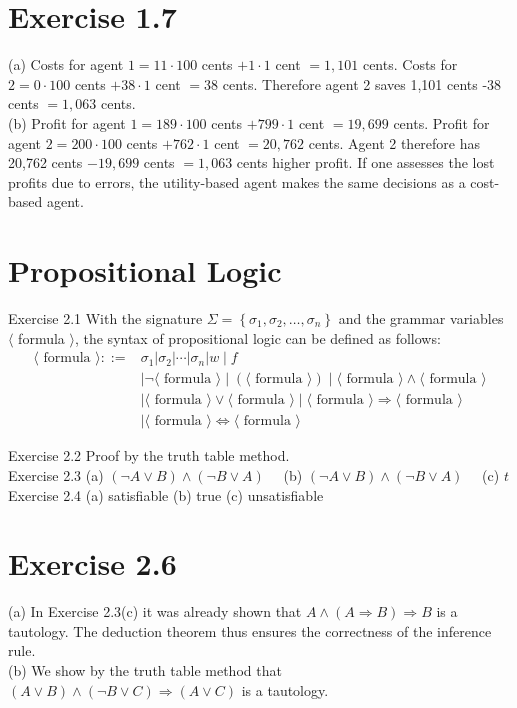 \documentclass[10pt]{book}
\begin{document}
\section{Exercise 1.7}
(a) Costs for agent $1=11 \cdot 100$ cents $+1 \cdot 1$ cent $=1,101$ cents. Costs for $2=0 \cdot 100$ cents $+38 \cdot 1$ cent $=38$ cents. Therefore agent 2 saves 1,101 cents -38 cents $=1,063$ cents.\\
(b) Profit for agent $1=189 \cdot 100$ cents $+799 \cdot 1$ cent $=19,699$ cents. Profit for agent $2=200 \cdot 100$ cents $+762 \cdot 1$ cent $=20,762$ cents. Agent 2 therefore has 20,762 cents $-19,699$ cents $=1,063$ cents higher profit. If one assesses the lost profits due to errors, the utility-based agent makes the same decisions as a cost-based agent.

\section{Propositional Logic}
Exercise 2.1 With the signature $\Sigma=\left\{\sigma_{1}, \sigma_{2}, \ldots, \sigma_{n}\right\}$ and the grammar variables $\langle$ formula $\rangle$, the syntax of propositional logic can be defined as follows:
$$
\begin{aligned}
\langle\text { formula }\rangle::= & \sigma_{1}\left|\sigma_{2}\right| \cdots\left|\sigma_{n}\right| w \mid f \\
& \mid \neg\langle\text { formula }\rangle \mid(\langle\text { formula }\rangle) \mid\langle\text { formula }\rangle \wedge\langle\text { formula }\rangle \\
& \mid\langle\text { formula }\rangle \vee\langle\text { formula }\rangle \mid\langle\text { formula }\rangle \Rightarrow\langle\text { formula }\rangle \\
& \mid\langle\text { formula }\rangle \Leftrightarrow\langle\text { formula }\rangle
\end{aligned}
$$

Exercise 2.2 Proof by the truth table method.\\
Exercise 2.3 (a) $(\neg A \vee B) \wedge(\neg B \vee A) \quad$ (b) $(\neg A \vee B) \wedge(\neg B \vee A) \quad$ (c) $t$\\
Exercise 2.4 (a) satisfiable (b) true (c) unsatisfiable

\section{Exercise 2.6}
(a) In Exercise 2.3(c) it was already shown that $A \wedge(A \Rightarrow B) \Rightarrow B$ is a tautology. The deduction theorem thus ensures the correctness of the inference rule.\\
(b) We show by the truth table method that $(A \vee B) \wedge(\neg B \vee C) \Rightarrow(A \vee C)$ is a tautology.
\end{document}
